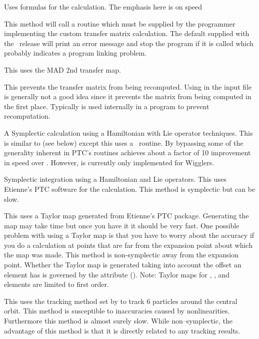 \begin{description}

\item[\vn{Bmad_Standard}]
Uses formulas for the calculation. The emphasis here is on speed

\item[\vn{Custom}]
This method will call a routine  which must be
supplied by the programmer implementing the custom transfer matrix
calculation. The default  supplied with the
\bmad\ release will print an error message and stop the program if it
is called which probably indicates a program linking problem.

\item[\vn{MAD}]
This uses the MAD 2nd transfer map.

\item[\vn{None}]
This prevents the transfer matrix from being recomputed.
Using  in the input file is generally not a good idea since
it prevents the matrix from being computed in the first place.
Typically  is used internally in a program to prevent recomputation.

\item[\vn{Symp_Lie_Bmad}]
A Symplectic calculation using a Hamiltonian with Lie operator techniques.
This is similar to  (see below) except this uses a
\bmad\ routine. By bypassing some of the generality inherent in PTC's routines
 achieves about a factor of 10 improvement in speed over
. However,  is
currently only implemented for Wigglers.

\item[\vn{Symp_Lie_PTC}]
Symplectic integration using a Hamiltonian and Lie operators.
This uses Etienne's PTC software for the calculation.
This method is symplectic but can be slow.

\item[\vn{Taylor}]
This uses a Taylor map generated from Etienne's PTC
package. Generating the map may take time but once you have it it
should be very fast. One possible problem with using a Taylor map is
that you have to worry about the accuracy if you do a calculation at
points that are far from the expansion point about which the map was
made. This method is non-symplectic away from the expansion
point. Whether the Taylor map is generated taking into account the
offset an element has is governed by the 
attribute ().
Note: Taylor maps for , ,
and  elements are limited to first order.

\item[\vn{Tracking}]
This uses the tracking method set by  to track 6
particles around the central orbit. This method is susceptible to inaccuracies
caused by nonlinearities. Furthermore this method
is almost surely slow. While non--symplectic, the advantage of this method
is that it is directly related to any tracking results.

\end{description}

